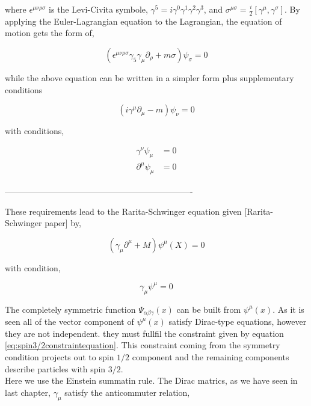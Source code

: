 where $\epsilon^{\mu\nu\rho\sigma}$ is the Levi-Civita symbole, $\gamma^{5}=i\gamma^{0}\gamma^{1}\gamma^{2}\gamma^{3}$, and $\sigma^{\mu\sigma}=\frac{i}{2}[\gamma^{\mu},\gamma^{\sigma}]$. By applying the Euler-Lagrangian equation to the Lagrangian, the equation of motion gets the form of,

\begin{equation}
   \left( \epsilon^{\mu\nu\rho\sigma} \gamma_{5}\gamma_{\mu} \partial_{\rho} + m\sigma \right) \psi_{\sigma} = 0
\end{equation}

while the above equation can be written in a simpler form plus supplementary conditions

\begin{equation}
   ( i\gamma^{\mu}\partial_{\mu} - m ) \psi_{\nu} = 0
\end{equation}

with conditions,

\begin{align}
   \gamma^{\nu} \psi_{\mu} &= 0 \\
   \partial^{\mu} \psi_{\mu} &= 0
\end{align}


-------------------------------------------------------------------


These requirements lead to the Rarita-Schwinger equation given [Rarita-Schwinger paper] by,

\begin{equation}
   \left(\gamma_{\mu}\partial^{\mu} + M \right) \psi^{\mu}(X)= 0
\end{equation}

with condition,

\begin{equation} \label{eq:spin3/2constraintequation}
   \gamma_{\mu}\psi^{\mu} = 0
\end{equation}

The completely symmetric function $\Psi_{\alpha\beta\gamma}(x)$ can be built from $\psi^{\mu}(x)$. As it is seen all of the vector component of $\psi^{\mu}(x)$ satisfy Dirac-type equations, however they are not independent. they must fullfil the constraint given by equation \ref{eq:spin3/2constraintequation}. This constraint coming from the symmetry condition projects out to spin $1/2$ component and the remaining components describe particles with spin $3/2$.\\

Here we use the Einstein summatin rule. The Dirac matrics, as we have seen in last chapter, $\gamma_{\mu}$ satisfy the anticommuter relation,

